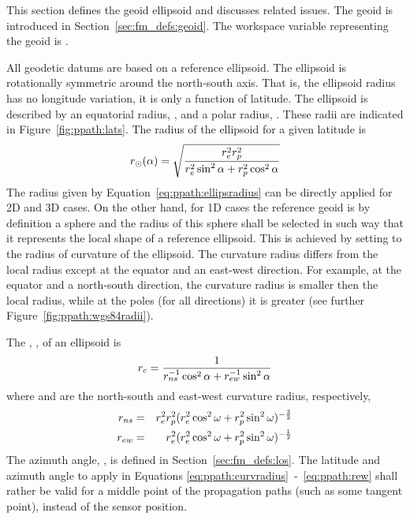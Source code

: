 This section defines the geoid ellipsoid and discusses related
issues. The geoid is introduced in Section~\ref{sec:fm_defs:geoid}.
The workspace variable representing the geoid is .


\label{sec:ppath:geoid}

All geodetic datums are based on a reference ellipsoid. The ellipsoid is rotationally symmetric around the
north-south axis. That is, the ellipsoid radius has no longitude
variation, it is only a function of latitude. The ellipsoid is
described by an equatorial radius, , and a polar radius,
. These radii are indicated in Figure~\ref{fig:ppath:lats}.
The radius of the ellipsoid for a given latitude is
\begin{equation}
 r_{\odot}(\alpha) = \sqrt{\frac{r_{e}^2r_{p}^2}
                    {r_{e}^2\sin^2\alpha+r_{p}^2\cos^2\alpha}}
 \label{eq:ppath:ellipsradius} 
\end{equation}
The radius given by Equation~\ref{eq:ppath:ellipsradius} can be
directly applied for 2D and 3D cases. On the other hand, for 1D cases
the reference geoid is by definition a sphere and the radius of this
sphere shall be selected in such way that it represents the local
shape of a reference ellipsoid. This is achieved by setting
\aRds{\odot} to the radius of curvature of the ellipsoid. The
curvature radius differs from the local radius except at the equator
and an east-west direction. For example, at the equator and a
north-south direction, the curvature radius is smaller then the local
radius, while at the poles (for all directions) it is greater
(see further Figure~\ref{fig:ppath:wgs84radii}). 

The , , of an ellipsoid is 
\citep{rodgers:00}
\begin{equation}
 r_{c} = \frac{1}{r_{ns}^{-1}\cos^2 \alpha + r_{ew}^{-1}\sin^2 \alpha}
 \label{eq:ppath:curvradius} 
\end{equation}
where  and  are the north-south and east-west curvature radius, respectively,
\begin{eqnarray}
 r_{ns} &=& r_{e}^2r_{p}^2 (
           r_{e}^2\cos^2\omega+r_{p}^2\sin^2\omega )^{-\frac{3}{2}} \\
 r_{ew} &=& r_{e}^2 (
           r_{e}^2\cos^2\omega+r_{p}^2\sin^2\omega )^{-\frac{1}{2}} 
 \label{eq:ppath:rew} 
\end{eqnarray}
The azimuth angle, \AzmAng, is defined in
Section~\ref{sec:fm_defs:los}. The latitude and azimuth angle to
apply in Equations \ref{eq:ppath:curvradius}~-~\ref{eq:ppath:rew}
shall rather be valid for a middle point of the propagation paths
(such as some tangent point), instead of the sensor position. 

